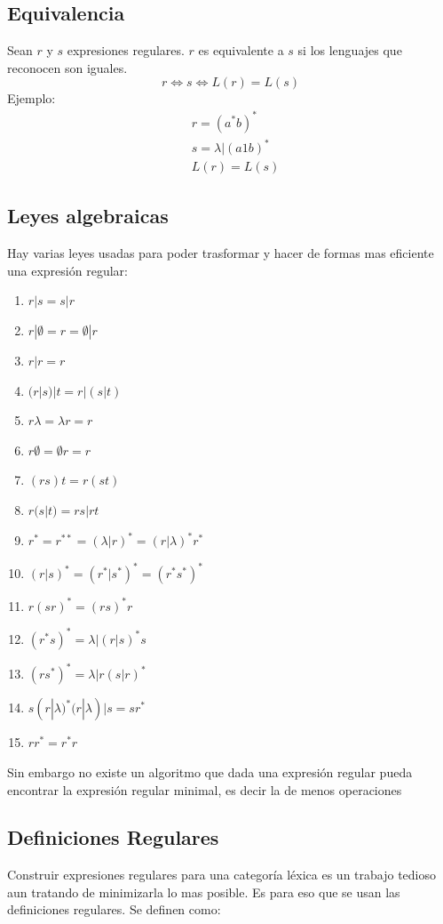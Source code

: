 \subsection{Equivalencia}

Sean $r$ y $s$ expresiones regulares. $r$ es equivalente a $s$ si los lenguajes que reconocen son iguales.
\begin{equation*}
    r \Leftrightarrow s \Longleftrightarrow L(r) = L(s) 
\end{equation*}
Ejemplo:\\
\begin{align*}
&r = (a^*b)^*\\
&s = \lambda|(a1b)^*\\
&L(r) = L(s)
\end{align*}

\subsection{Leyes algebraicas}
Hay varias leyes usadas para poder trasformar y hacer de formas mas eficiente una expresión regular:
\begin{enumerate}
    \item $r|s=s|r$
    \item $r|\emptyset=r=\emptyset|r$
    \item$r|r=r$
    \item$(r|s)|t=r|(s|t)$
    \item$r\lambda=\lambda r = r$
    \item$r\emptyset=\emptyset r = r$
    \item$(rs)t = r(st)$
    \item$r(s|t)=rs|rt$
    \item$r^*=r^{**}=(\lambda | r)^* = (r|\lambda)^*r^*$
    \item$(r|s)^*=(r^*|s^*)^*=(r^*s^*)^*$
    \item$ r(sr)^*=(rs)^*r$
    \item$(r^*s)^*=\lambda|(r|s)^*s$
    \item $(rs^*)^*=\lambda|r(s|r)^*$
    \item$s(r|\lambda)^*(r|\lambda)|s=sr^*$
    \item$rr^*=r^*r$
\end{enumerate}

Sin embargo no existe un algoritmo que dada una expresión regular pueda encontrar la expresión regular minimal, es decir la de menos operaciones

\subsection{Definiciones Regulares}
Construir expresiones regulares para una categoría léxica es un trabajo tedioso aun tratando de minimizarla lo mas posible. Es para eso que se usan las definiciones regulares. Se definen como:\\

